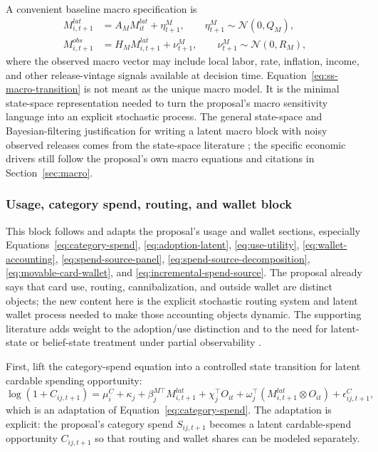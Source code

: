 \documentclass[11pt]{article}
\newcommand{\1}{\mathbf{1}}
\begin{document}
A convenient baseline macro specification is
\begin{align}
  M^{lat}_{i,t+1}
    &= A_M M^{lat}_{it} + \eta^{M}_{t+1},
       \qquad \eta^{M}_{t+1}\sim\mathcal{N}(0,Q_M),
       \label{eq:ss-macro-transition}\\
  M^{obs}_{i,t+1}
    &= H_M M^{lat}_{i,t+1} + \nu^{M}_{t+1},
       \qquad \nu^{M}_{t+1}\sim\mathcal{N}(0,R_M),
       \label{eq:ss-macro-observation}
\end{align}
where the observed macro vector may include local labor, rate, inflation,
income, and other release-vintage signals available at decision time.
Equation~\eqref{eq:ss-macro-transition} is not meant as the unique macro model.
It is the minimal state-space representation needed to turn the proposal's macro
sensitivity language into an explicit stochastic process. The general state-space
and Bayesian-filtering justification for writing a latent macro block with noisy
observed releases comes from the state-space literature
\citep{durbinkoopman2012ssm,westharrison1997bfdm}; the specific economic drivers
still follow the proposal's own macro equations and citations in
Section~\ref{sec:macro}.

\subsubsection{Usage, category spend, routing, and wallet block}
\label{subsec:state-space-usage-wallet}

This block follows and adapts the proposal's usage and wallet sections,
especially Equations~\eqref{eq:category-spend},
\eqref{eq:adoption-latent}, \eqref{eq:use-utility},
\eqref{eq:wallet-accounting}, \eqref{eq:spend-source-panel},
\eqref{eq:spend-source-decomposition}, \eqref{eq:movable-card-wallet}, and
\eqref{eq:incremental-spend-source}. The proposal already says that card use,
routing, cannibalization, and outside wallet are distinct objects; the new
content here is the explicit stochastic routing system and latent wallet process
needed to make those accounting objects dynamic. The supporting literature adds
weight to the adoption/use distinction and to the need for latent-state or
belief-state treatment under partial observability
\citep{koulayev2012payment,agarwal2010rewards,prelec2001creditcard,
smallwood1973pomdp,kaelbling1998pomdp}.

First, lift the category-spend equation into a controlled state transition for
latent cardable spending opportunity:
\begin{equation}
  \log(1+C_{ij,t+1})
  =
  \mu_i^{C} + \kappa_j + \beta_j^{M\top}M^{lat}_{i,t+1}
  + \chi_j^{\top}O_{it}
  + \omega_j^{\top}(M^{lat}_{i,t+1}\otimes O_{it})
  + \epsilon^C_{ij,t+1},
  \label{eq:ss-cardable-spend}
\end{equation}
which is an adaptation of Equation~\eqref{eq:category-spend}. The adaptation is
explicit: the proposal's category spend $S_{ij,t+1}$ becomes a latent
cardable-spend opportunity $C_{ij,t+1}$ so that routing and wallet shares can be
modeled separately.
\end{document}
